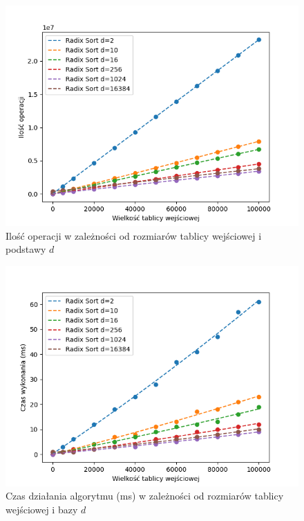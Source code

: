 \documentclass{article}
\begin{document}
\begin{figure}[H]
    \centering
    \includegraphics[width=1\textwidth]{Figure_3.png}
    \caption{Ilość operacji w zależności od rozmiarów tablicy wejściowej i podstawy $d$}
    \label{fig:radixsort}
\end{figure}
\begin{figure}[H]
    \centering
    \includegraphics[width=1\textwidth]{Figure_4.png}
    \caption{Czas działania algorytmu (ms) w zależności od rozmiarów tablicy wejściowej i bazy $d$}
    \label{fig:radixsortt}
\end{figure}
\end{document}
